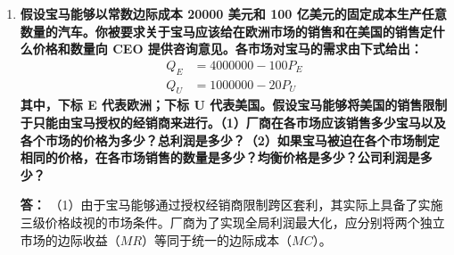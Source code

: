 \begin{enumerate}[label=\textbf{\arabic*.}, leftmargin=*]
\begin{center}
		\end{center}
		
		如图所示，假设市场存在两组消费者。在被禁止使用优惠券的统一定价体制下，垄断厂商为了保住高支付意愿群体（第 1 组）的巨额利润，会设定极高的统一价格 $P_U$。由于该价格完全高于对价格敏感群体（第 2 组）的保留价格，这部分消费者被彻底排斥在市场之外，产生巨大的无谓损失。
		
		若允许使用优惠券实施价格歧视，厂商将继续向第 1 组索取原高价 $P_1$（此时 $P_1 = P_U$，第 1 组的消费者剩余 $CS_1$ 毫发无损），同时利用优惠券向第 2 组提供折扣价 $P_2$。这一举措激活了原本死寂的弱势市场，使得第 2 组消费者获得了图中标注的 $CS_2$ 面积的新增剩余。在产量绝对扩张的情形下，总消费者剩余必然增加，禁止优惠券无疑是剥夺了这部分底层消费者的福利。
		
		禁止使用优惠券必然恶化德国生产者的境况。价格歧视是厂商主动优化的理性选择，其目标函数唯一指向总利润的最大化。厂商能够借助优惠券剥离出高弹性的边际消费者，在不侵蚀核心客群利润盘的前提下将这部分隐藏的剩余转化为自身的增量利润。法律的一刀切禁止直接剥夺了厂商的定价工具，迫使其退守至次优的单一统一定价均衡点，不可逆地削弱了生产者的盈利能力。
		
		\item \textbf{假设宝马能够以常数边际成本 20000 美元和 100 亿美元的固定成本生产任意数量的汽车。你被要求关于宝马应该给在欧洲市场的销售和在美国的销售定什么价格和数量向 CEO 提供咨询意见。各市场对宝马的需求由下式给出：}
		\[
		\begin{aligned}
			Q_E &= 4000000 - 100P_E \\
			Q_U &= 1000000 - 20P_U
		\end{aligned}
		\]
		\textbf{其中，下标 E 代表欧洲；下标 U 代表美国。假设宝马能够将美国的销售限制于只能由宝马授权的经销商来进行。（1）厂商在各市场应该销售多少宝马以及各个市场的价格为多少？总利润是多少？（2）如果宝马被迫在各个市场制定相同的价格，在各市场销售的数量是多少？均衡价格是多少？公司利润是多少？}
		
		\textbf{答：}
		（1）由于宝马能够通过授权经销商限制跨区套利，其实际上具备了实施三级价格歧视的市场条件。厂商为了实现全局利润最大化，应分别将两个独立市场的边际收益（$MR$）等同于统一的边际成本（$MC$）。
		

\end{enumerate}

